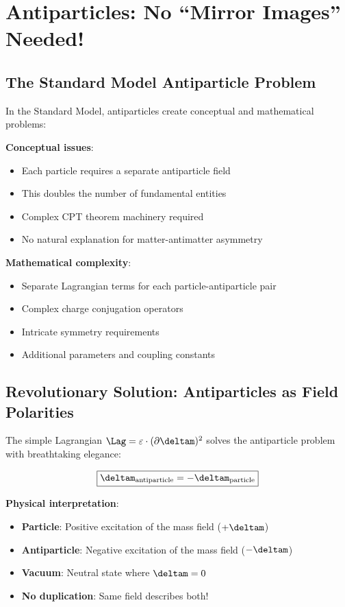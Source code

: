 	\section{Antiparticles: No ``Mirror Images'' Needed!}
	
	\subsection{The Standard Model Antiparticle Problem}
	
	In the Standard Model, antiparticles create conceptual and mathematical problems:
	
	\textbf{Conceptual issues}:
	\begin{itemize}
		\item Each particle requires a separate antiparticle field
		\item This doubles the number of fundamental entities
		\item Complex CPT theorem machinery required
		\item No natural explanation for matter-antimatter asymmetry
	\end{itemize}
	
	\textbf{Mathematical complexity}:
	\begin{itemize}
		\item Separate Lagrangian terms for each particle-antiparticle pair
		\item Complex charge conjugation operators
		\item Intricate symmetry requirements
		\item Additional parameters and coupling constants
	\end{itemize}
	
	\subsection{Revolutionary Solution: Antiparticles as Field Polarities}
	
	The simple Lagrangian $\Lag = \varepsilon \cdot (\partial \deltam)^2$ solves the antiparticle problem with breathtaking elegance:
	
	\begin{equation}
		\boxed{\deltam_{\text{antiparticle}} = -\deltam_{\text{particle}}}
		\label{eq:antiparticle_solution}
	\end{equation}
	
	\textbf{Physical interpretation}:
	\begin{itemize}
		\item \textbf{Particle}: Positive excitation of the mass field ($+\deltam$)
		\item \textbf{Antiparticle}: Negative excitation of the mass field ($-\deltam$)  
		\item \textbf{Vacuum}: Neutral state where $\deltam = 0$
		\item \textbf{No duplication}: Same field describes both!
	\end{itemize}
	
